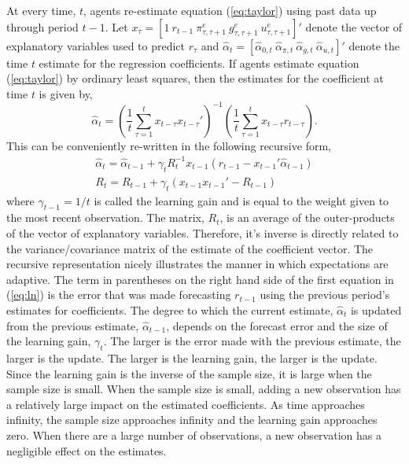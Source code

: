 \documentclass[12pt]{article}
\newcommand{\beq}{\begin{equation}}
\newcommand{\eeq}{\end{equation}}
\begin{document}
At every time, $t$, agents re-estimate equation (\ref{eq:taylor}) using past data up through period $t-1$.  Let $x_{\tau} = [1~ r_{t-1}~ \pi_{\tau,\tau+1}^e~ g_{\tau,\tau+1}^e~ u_{\tau,\tau+1}^e]'$ denote the vector of explanatory variables used to predict $r_{\tau}$ and $\hat{\alpha}_t = [\hat{\alpha}_{0,t}~ \hat{\alpha}_{\pi,t}~  \hat{\alpha}_{g,t}~  \hat{\alpha}_{u,t}]'$ denote the time $t$ estimate for the regression coefficients.  If agents estimate equation (\ref{eq:taylor}) by ordinary least squares, then the estimates for the coefficient at time $t$ is given by,
\beq \label{eq:ols} \hat{\alpha}_t = \left( \frac{1}{t} \sum_{\tau=1}^{t} x_{t-\tau} x_{t-\tau}' \right)^{-1}  \left( \frac{1}{t} \sum_{\tau=1}^{t} x_{t-\tau}  r_{t-\tau} \right). \eeq
This can be conveniently re-written in the following recursive form,
\beq \label{eq:ln} \begin{array}{c}
\hat{\alpha}_t = \hat{\alpha}_{t-1} + \gamma_t  R_t^{-1} x_{t-1} \left(r_{t-1} - x_{t-1}'\hat{\alpha}_{t-1}\right) \\ [0.5pc]
R_t = R_{t-1} + \gamma_t \left(x_{t-1} x_{t-1}' - R_{t-1}\right) 
\end{array} \eeq
where $\gamma_{t-1} = 1/t$ is called the learning gain and is equal to the weight given to the most recent observation.  The matrix, $R_t$, is an average of the outer-products of the vector of explanatory variables.  Therefore, it's inverse is directly related to the variance/covariance matrix of the estimate of the coefficient vector.  The recursive representation nicely illustrates the manner in which expectations are adaptive.  The term in parentheses on the right hand side of the first equation in (\ref{eq:ln}) is the error that was made forecasting $r_{t-1}$ using the previous period's estimates for coefficients.  The degree to which the current estimate, $\hat{\alpha}_t$ is updated from the previous estimate, $\hat{\alpha}_{t-1}$, depends on the forecast error and the size of the learning gain, $\gamma_t$.  The larger is the error made with the previous estimate, the larger is the update.  The larger is the learning gain, the larger is the update.  Since the learning gain is the inverse of the sample size, it is large when the sample size is small.  When the sample size is small, adding a new observation has a relatively large impact on the estimated coefficients.  As time approaches infinity, the sample size approaches infinity and the learning gain approaches zero.  When there are a large number of observations, a new observation has a negligible effect on the estimates.
 
\end{document}
